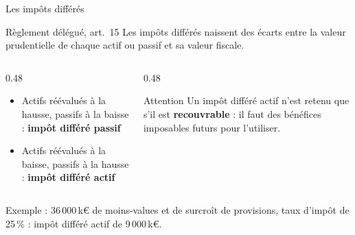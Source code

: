 \documentclass[10pt,aspectratio=169]{beamer}
\newcommand{\keur}{\,k\euro}
\begin{document}
\begin{frame}{Les impôts différés}
\begin{block}{Règlement délégué, art.~15}
Les impôts différés naissent des écarts entre la valeur prudentielle de chaque actif ou passif et
sa valeur fiscale.
\end{block}
\begin{columns}[T]
\begin{column}{0.48\textwidth}
\begin{itemize}
  \item Actifs réévalués à la hausse, passifs à la baisse : \textbf{impôt différé passif}
  \item Actifs réévalués à la baisse, passifs à la hausse : \textbf{impôt différé actif}
\end{itemize}
\end{column}
\begin{column}{0.48\textwidth}
\begin{alertblock}{Attention}
Un impôt différé actif n'est retenu que s'il est \textbf{recouvrable} : il faut des bénéfices
imposables futurs pour l'utiliser.
\end{alertblock}
\end{column}
\end{columns}
\vspace{0.3cm}
\small Exemple : 36\,000\keur{} de moins-values et de surcroît de provisions, taux d'impôt de 25\,\% :
impôt différé actif de 9\,000\keur.
\end{frame}
\end{document}

